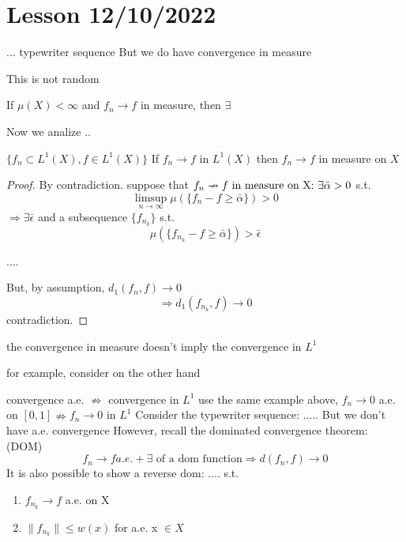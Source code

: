 \section{Lesson 12/10/2022}
... typewriter sequence
But we do have convergence in measure

\begin{remark}
    \( f_p \nrightarrow 0 $ a.e. on [0, 1]
    But consider \( \{ f_{p(n,1)}: n \in \mathbb{N} \} \). This is a subsequence and, by def \[  \] 
    For this subsequence, we have $f_{p(n,1)}(x) \rightarrow 0 \) as \( n \to\infty \ \forall x \in (0, 1] \)
    ..
    
\end{remark}
This is not random

\begin{proposition}
    If \(\mu(X) < \infty \) and \(f_n \rightarrow f \) in measure, then \(\exists\)
\end{proposition}
Now we analize ..
\begin{theorem}
    \( \{f_n \subset L^1(X), f \in L^1(X)\} \) If \(f_n \rightarrow f \) in \(L^1(X)\) then \(f_n \rightarrow f \) in measure on \(X\)
\end{theorem}
\begin{proof}
    By contradiction.
    suppose that \(f_n \nrightarrow f $ in measure on X: $\exists \bar{\alpha} >0 \) s.t. 
    \[ \limsup_{n\to\infty} \mu(\{ f_n-f \geq \bar{\alpha} \}) >0  \]
    \(\Rightarrow \exists \bar{\epsilon}\) and a subsequence \( \{ f_{n_k} \} \) s.t.
    \[ \mu(\{ f_{n_k}-f \geq \bar{\alpha} \}) > \bar{\epsilon}  \]

    ....

    But, by assumption, \(d_1(f_n, f) \rightarrow 0\)
    \[ \Rightarrow d_1(f_{n_k}, f) \rightarrow 0 \] 
    contradiction.
\end{proof}

\begin{remark}
    the convergence in measure doesn't imply the convergence in $L^1$
\end{remark}
for example, consider 
on the other hand

convergence a.e. \(\nRightarrow\) convergence in \(L^1\)
use the same example above, \(f_n \rightarrow 0\) a.e. on \([0, 1] \nRightarrow f_n \rightarrow 0\) in \(L^1\)
Consider the typewriter sequence: .....
But we don't have a.e. convergence 
However, recall the dominated convergence theorem: (DOM)
\[ f_n \rightarrow f a.e. + \exists \text{ of a dom function} \Rightarrow d(f_n, f)\rightarrow 0 \]
It is also possible to show a reverse dom:
.... s.t. 
\begin{enumerate}
    \item \(f_{n_k} \rightarrow f\) a.e. on X
    \item \(\| f_{n_k} \| \leq w(x) \) for a.e. x \(\in X\)
\end{enumerate}


